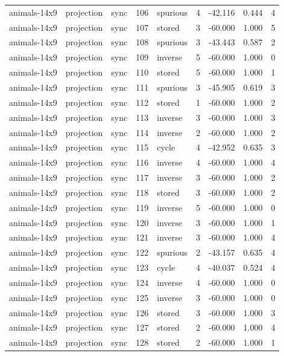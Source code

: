 \begin{tabular}{lllrlrrrr}
animals-14x9 & projection & sync & 106 & spurious & 4 & -42.116 & 0.444 & 4 \\
animals-14x9 & projection & sync & 107 & stored & 3 & -60.000 & 1.000 & 5 \\
animals-14x9 & projection & sync & 108 & spurious & 3 & -43.443 & 0.587 & 2 \\
animals-14x9 & projection & sync & 109 & inverse & 5 & -60.000 & 1.000 & 0 \\
animals-14x9 & projection & sync & 110 & stored & 5 & -60.000 & 1.000 & 1 \\
animals-14x9 & projection & sync & 111 & spurious & 3 & -45.905 & 0.619 & 3 \\
animals-14x9 & projection & sync & 112 & stored & 1 & -60.000 & 1.000 & 2 \\
animals-14x9 & projection & sync & 113 & inverse & 3 & -60.000 & 1.000 & 3 \\
animals-14x9 & projection & sync & 114 & inverse & 2 & -60.000 & 1.000 & 2 \\
animals-14x9 & projection & sync & 115 & cycle & 4 & -42.952 & 0.635 & 3 \\
animals-14x9 & projection & sync & 116 & inverse & 4 & -60.000 & 1.000 & 4 \\
animals-14x9 & projection & sync & 117 & inverse & 3 & -60.000 & 1.000 & 2 \\
animals-14x9 & projection & sync & 118 & stored & 3 & -60.000 & 1.000 & 2 \\
animals-14x9 & projection & sync & 119 & inverse & 5 & -60.000 & 1.000 & 0 \\
animals-14x9 & projection & sync & 120 & inverse & 3 & -60.000 & 1.000 & 1 \\
animals-14x9 & projection & sync & 121 & inverse & 3 & -60.000 & 1.000 & 4 \\
animals-14x9 & projection & sync & 122 & spurious & 2 & -43.157 & 0.635 & 4 \\
animals-14x9 & projection & sync & 123 & cycle & 4 & -40.037 & 0.524 & 4 \\
animals-14x9 & projection & sync & 124 & inverse & 4 & -60.000 & 1.000 & 0 \\
animals-14x9 & projection & sync & 125 & inverse & 3 & -60.000 & 1.000 & 0 \\
animals-14x9 & projection & sync & 126 & stored & 3 & -60.000 & 1.000 & 3 \\
animals-14x9 & projection & sync & 127 & stored & 2 & -60.000 & 1.000 & 4 \\
animals-14x9 & projection & sync & 128 & stored & 2 & -60.000 & 1.000 & 1 \\

\end{tabular}

